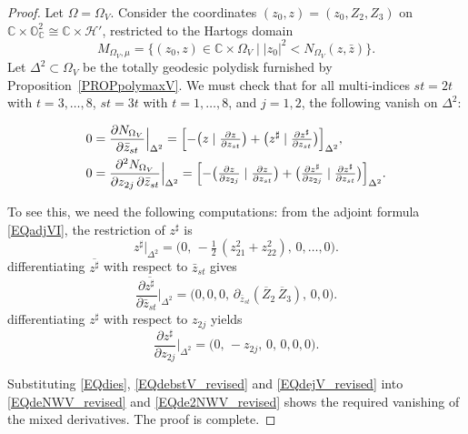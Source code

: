 \documentclass[reqno, 11pt]{amsart}
\newcommand{\C}{\mathbb{C}}
\begin{document}
\begin{proof}
Let \(\Omega = \Omega_{V}\).  Consider the coordinates \((z_0,z) = (z_0, Z_2, Z_3)\) on \(\mathbb{C} \times \mathbb{O}_{\mathbb{C}}^2 \cong \C \times \mathcal H '\), restricted to the Hartogs domain
\[
M_{\Omega_V,\mu}
=\bigl\{(z_0,z)\in\C\times\Omega_V \mid |z_0|^2 < N_{\Omega_V}(z,\bar z)\bigr\}.
\]
Let \(\Delta^2\subset\Omega_V\) be the totally geodesic polydisk furnished by Proposition~\ref{PROPpolymaxV}.  We must check that for all multi‐indices \(st = 2t\) with \(t=3,\dots,8\), \(st=3t\) with \(t=1,\dots,8\), and \(j=1,2\), the following vanish on \(\Delta^2\):

\begin{align}
0&=\frac{\partial N_{\Omega_V}}{\partial\bar z_{st}}\Big\vert_{\Delta^2}
=\Bigl[-\bigl(z\mid\tfrac{\partial z}{\partial z_{st}}\bigr)
       +\bigl(z^\sharp\mid\tfrac{\partial{z}^\sharp}{\partial z_{st}}\bigr)\Bigr]_{\Delta^2},
\label{EQdeNWV_revised}\\
0&=\frac{\partial^2N_{\Omega_V}}{\partial z_{2j}\,\partial\bar z_{st}}\Big\vert_{\Delta^2}
=\Bigl[-\bigl(\tfrac{\partial z}{\partial z_{2j}}\mid\tfrac{\partial z}{\partial z_{st}}\bigr)
       +\bigl(\tfrac{\partial z^\sharp}{\partial z_{2j}}\mid\tfrac{\partial{z}^\sharp}{\partial z_{st}}\bigr)\Bigr]_{\Delta^2}.
\label{EQde2NWV_revised}
\end{align}

To see this, we need the following computations:
from the adjoint formula \eqref{EQadjVI}, the restriction of \(z^\sharp\) is
\begin{equation}\label{EQdies}
z^\sharp\big\vert_{\Delta^2}
=\bigl(0,\,-\tfrac12\,(z_{21}^2+z_{22}^2),\,0,\dots,0\bigr).
\end{equation}
differentiating \(\overline{z^\sharp}\) with respect to \(\bar z_{st}\) gives
\begin{equation}\label{EQdebstV_revised}
\frac{\partial\overline{z^\sharp}}{\partial\bar z_{st}}\Big\vert_{\Delta^2}
=\bigl(0,0,0,\,\partial_{\bar z_{st}}(\overline{Z}_2\,\overline{Z}_3),\,0,0\bigr).
\end{equation}
 differentiating \(z^\sharp\) with respect to \(z_{2j}\) yields
\begin{equation}\label{EQdejV_revised}
\frac{\partial z^\sharp}{\partial z_{2j}}\Big\vert_{\Delta^2}
=\bigl(0,\,-z_{2j},\,0,\,0,0,0\bigr).
\end{equation}  

Substituting \eqref{EQdies}, \eqref{EQdebstV_revised} and \eqref{EQdejV_revised} into \eqref{EQdeNWV_revised} and \eqref{EQde2NWV_revised} shows the required vanishing of the mixed derivatives. The proof is complete.

\end{proof}
\end{document}
